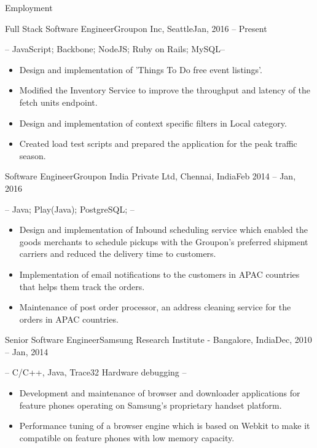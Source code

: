 \documentclass[]{mcdowellcv}
\begin{document}
	\makeheader
	\begin{cvsection}{Employment}
		\begin{cvsubsection}{Full Stack Software Engineer}{Groupon Inc, Seattle}{Jan, 2016 -- Present}
			\item {} -- JavaScript; Backbone; NodeJS; Ruby on Rails;  MySQL--
			\begin{itemize}
			 	\item Design and implementation of 'Things To Do free event listings'.
				\item Modified the Inventory Service to improve the throughput and latency of the fetch units endpoint.
				\item Design and implementation of context specific filters in Local category.
				\item Created load test scripts and prepared the application for the peak traffic season.
			\end{itemize}
		\end{cvsubsection}

		\begin{cvsubsection}{Software Engineer}{Groupon India Private Ltd, Chennai, India}{Feb 2014 -- Jan, 2016}
			\item {} -- Java; Play(Java); PostgreSQL; --
			\begin{itemize}
				\item  Design and implementation of Inbound scheduling service which enabled the goods merchants to schedule pickups with the Groupon's preferred shipment carriers and reduced the delivery time to customers.
				\item Implementation of email notifications to the customers in APAC countries that helps them track the orders.
				\item Maintenance of post order processor, an address cleaning service for the orders in APAC countries.
			\end{itemize}
		\end{cvsubsection}

		\begin{cvsubsection}{Senior Software Engineer}{Samsung Research Institute - Bangalore, India}{Dec, 2010 -- Jan, 2014}

			\item  {} -- C/C++, Java, Trace32 Hardware debugging --
			\begin{itemize}
				\item Development and maintenance of browser and downloader applications for feature phones operating on Samsung's proprietary handset platform.
				\item Performance tuning of a browser engine which is based on Webkit to make it compatible on feature phones with low memory capacity.
			\end{itemize}
		\end{cvsubsection}
	\end{cvsection}
\end{document}
